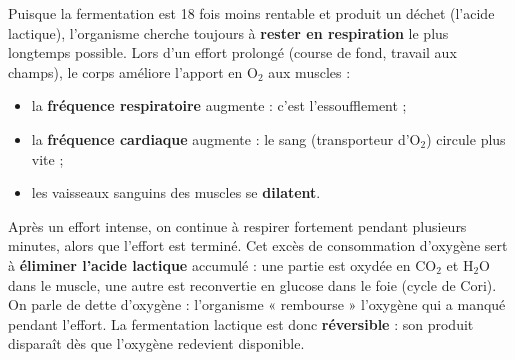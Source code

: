\documentclass[11pt]{article}
\newcommand{\cle}[1]{{\popxbold\color{popdark}#1}}
\begin{document}
Puisque la fermentation est 18 fois moins rentable et produit un déchet (l'acide lactique), l'organisme cherche toujours à \textbf{rester en respiration} le plus longtemps possible. Lors d'un effort prolongé (course de fond, travail aux champs), le corps améliore l'apport en O$_2$ aux muscles :

\begin{itemize}
\item la \textbf{fréquence respiratoire} augmente : c'est l'\cle{essoufflement} ;
\item la \textbf{fréquence cardiaque} augmente : le sang (transporteur d'O$_2$) circule plus vite ;
\item les vaisseaux sanguins des muscles se \textbf{dilatent}.
\end{itemize}

\begin{aretenir}
Après un effort intense, on continue à respirer fortement pendant plusieurs minutes, alors que l'effort est terminé. Cet excès de consommation d'oxygène sert à \textbf{éliminer l'acide lactique} accumulé : une partie est oxydée en CO$_2$ et H$_2$O dans le muscle, une autre est reconvertie en glucose dans le foie (cycle de Cori). On parle de \cle{dette d'oxygène} : l'organisme « rembourse » l'oxygène qui a manqué pendant l'effort. La fermentation lactique est donc \textbf{réversible} : son produit disparaît dès que l'oxygène redevient disponible.
\end{aretenir}
\end{document}
